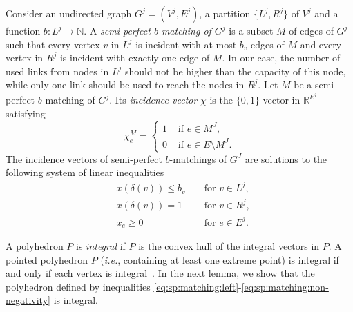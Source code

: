 Consider an undirected graph $G^j = (V^j,E^j)$, a partition
$\{L^j,R^j\}$ of $V^j$ and a function $b : L^j \longrightarrow
\mathbb{N}$.  A {\em semi-perfect $b$-matching of $G^j$} is a subset
$M$ of edges of $G^j$ such that every vertex $v$ in $L^j$ is incident
with at most $b_v$ edges of $M$ and every vertex in $R^j$ is incident
with exactly one edge of $M$. In our case, the number of used links
from nodes in $L^j$ should not be higher than the capacity of this
node, while only one link should be used to reach the nodes in $R^j$.
Let $M$ be a semi-perfect $b$-matching of $G^j$. Its {\em incidence
  vector} $\chi$ is the $\{0,1\}$-vector in $\mathbb{R}^{E^j}$
satisfying
\begin{equation*}
\chi^M_e = \left\{
\begin{array}{ll}
1 & \textrm{ if } e \in M^J,\\
0 & \textrm{ if } e \in E \setminus M^J.
\end{array}
\right.
\end{equation*}
The incidence vectors of semi-perfect $b$-matchings of $G^J$ are solutions
to the following system of linear inequalities
\begin{align}
\label{eq:sp:matching:left} & x(\delta(v)) \leq b_v && \textrm{ for } v \in L^j,\\
\label{eq:sp:matching:right} & x(\delta(v)) = 1 && \textrm{ for } v \in R^j,\\
\label{eq:sp:matching:non-negativity} & x_e \geq 0 && \textrm{ for } e \in E^j.
\end{align}

A polyhedron $P$ is {\em integral} if $P$ is the convex hull of the
integral vectors in $P$. A pointed polyhedron $P$ (\textit{i.e.},
containing at least one extreme point) is integral if and only if each
vertex is integral~\cite{schrijver2003cop}.  In the next lemma, we
show that the polyhedron defined by inequalities
\eqref{eq:sp:matching:left}-\eqref{eq:sp:matching:non-negativity} is
integral.

